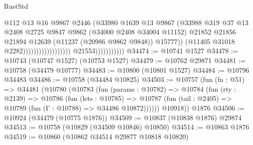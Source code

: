 \begin{lexlean}{RustStd}
\begin{coremodule}
                                                            @112
                                                            @13
                                                            @16
                                                            @9867
                                                            @2446
                                                            (@33980
                                                              @1639
                                                              @13
                                                              @9867
                                                              (@33988
                                                                @319
                                                                @37
                                                                @13
                                                                @2408
                                                                @2725
                                                                @9847
                                                                @9862
                                                                (@34000 @2408 @34004 @11152)
                                                                @21852
                                                                @21856
                                                                @21894
                                                                @12639
                                                                (@11237 (@20986 @9862 @9848))
                                                                @15777))
                                                            (@11405 @31018 @2282))))))))))))))))))
                          @21553)))))))))))
@34474 := @10741 @1527
@34478 := @10743 (@10747 @1527) (@10753 @1527)
@34479 := @10762 @29871
@34481 := @10758 (@34479 @10777)
@34483 := @10800 (@10801 @1527)
@34484 := @10796 @34483
@34486 := @10758 (@34484 @10825)
@34503 := @10757
    (fun (fn : @51) =>
    @34481
      (@10780
        (@10783
          (fun (params : @10782) =>
          @10784
            (fun (rty : @2139) =>
            @10786
              (fun (lets : @10785) =>
              @10787 (fun (tail : @2405) => @10789 (fun (Γ : @10788) => @34486 @10872))))))
        @10918))
    @1876
@34506 := @10924 (@34479 (@10775 @1876))
@34509 := @10837 (@10838 @1876) @29874
@34513 := @10758 (@10829 (@34509 @10846) @10850)
@34514 := @10863 @1876
@34519 := @10860 (@10862 @34514 @29877 @10818 @10820)

\end{coremodule}
\end{lexlean}
